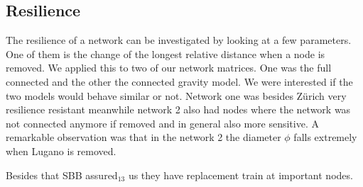 \documentclass[11pt]{article}
\begin{document}
\subsection{Resilience}

The resilience of a network can be investigated by looking at a few parameters. One of them is the change of the longest relative distance when a node is removed. We applied this to two of our network matrices. One was the full connected and the other the connected gravity model. We were interested if the two models would behave similar or not. Network one was besides Z\"urich very resilience resistant meanwhile network 2 also had nodes where the network was not connected anymore if removed and in general also more sensitive. A remarkable observation was that in the network 2 the diameter $\phi$ falls extremely when Lugano is removed.


 
Besides that SBB assured$_{13}$ us they have replacement train at important nodes.
\end{document}
